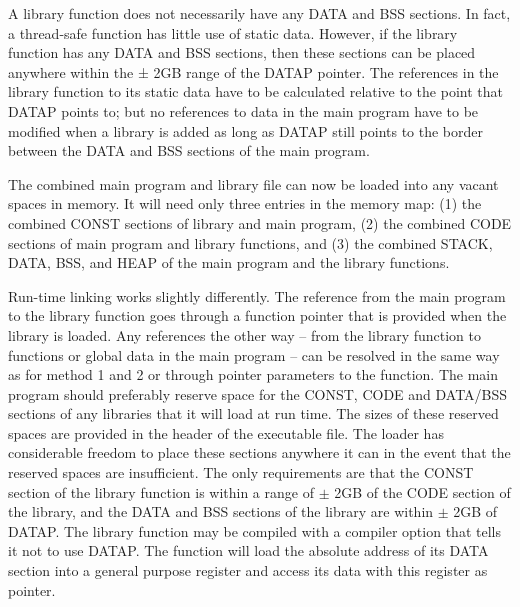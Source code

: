 \documentclass[forwardcom.tex]{subfiles}
\begin{document}
A library function does not necessarily have any DATA and BSS sections. In fact, a thread-safe function has little use of static data. However, if the library function has any DATA and BSS sections, then these sections can be placed anywhere within the ± 2GB range of the DATAP pointer. The references in the library function to its static data have to be calculated relative to the point that DATAP points to; but no references to data in the main program have to be modified when a library is added as long as DATAP still points to the border between the DATA and BSS sections of the main program. 
\vspace{2mm}

The combined main program and library file can now be loaded into any vacant spaces in memory. It will need only three entries in the memory map: (1) the combined CONST sections of library and main program, (2) the combined CODE sections of main program and library functions, and (3) the combined STACK, DATA, BSS, and HEAP of the main program and the library functions. 
\vspace{2mm}

Run-time linking works slightly differently. The reference from the main program to the library function goes through a function pointer that is provided when the library is loaded. Any references the other way -- from the library function to functions or global data in the main 
program -- can be resolved in the same way as for method 1 and 2 or through pointer parameters to the function. The main program should preferably reserve space for the CONST, CODE and DATA/BSS sections of any libraries that it will load at run time. The sizes of these reserved spaces are provided in the header of the executable file. The loader has considerable freedom to place these sections anywhere it can in the event that the reserved spaces are insufficient. The only requirements are that the CONST section of the library function is within a range of $\pm$ 2GB of the CODE section of the library, and the DATA and BSS sections of the library are within $\pm$ 2GB of DATAP. The library function may be compiled with a compiler option that tells it not to use DATAP. The function will load the absolute address of its DATA section into a general purpose register and access its data with this register as pointer. 
\vspace{2mm}
\end{document}
